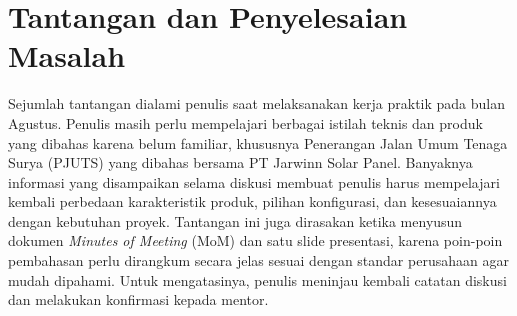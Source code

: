 \section{Tantangan dan Penyelesaian Masalah}
Sejumlah tantangan dialami penulis saat melaksanakan kerja praktik pada bulan Agustus. Penulis masih perlu mempelajari berbagai istilah teknis dan produk yang dibahas karena belum familiar, khususnya Penerangan Jalan Umum Tenaga Surya (PJUTS) yang dibahas bersama PT Jarwinn Solar Panel. Banyaknya informasi yang disampaikan selama diskusi membuat penulis harus mempelajari kembali perbedaan karakteristik produk, pilihan konfigurasi, dan kesesuaiannya dengan kebutuhan proyek. Tantangan ini juga dirasakan ketika menyusun dokumen \textit{Minutes of Meeting} (MoM) dan satu slide presentasi, karena poin-poin pembahasan perlu dirangkum secara jelas sesuai dengan standar perusahaan agar mudah dipahami. Untuk mengatasinya, penulis meninjau kembali catatan diskusi dan melakukan konfirmasi kepada mentor.
